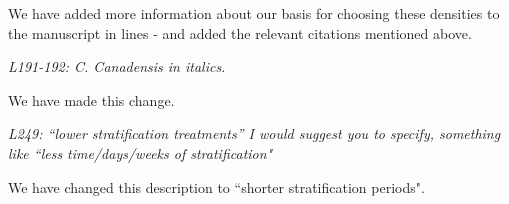 \documentclass[11pt]{article}
\begin{document}
We have added more information about our basis for choosing these densities to the manuscript in lines - and added the relevant citations mentioned above.


\emph{L191-192: C. Canadensis in italics.}

We have made this change.

\emph{L249: “lower stratification treatments” I would suggest you to specify, something like ``less time/days/weeks of stratification"}

We have changed this description to ``shorter stratification periods".


\end{document}

